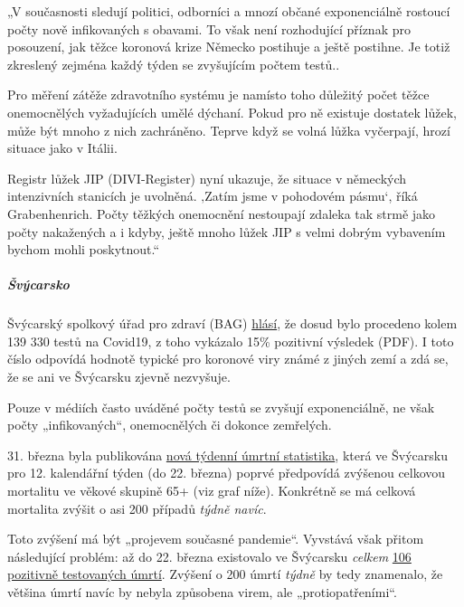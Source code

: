 „V současnosti sledují politici, odborníci a mnozí občané exponenciálně
rostoucí počty nově infikovaných s obavami. To však není rozhodující
příznak pro posouzení, jak těžce koronová krize Německo postihuje a
ještě postihne. Je totiž zkreslený zejména každý týden se zvyšujícím
počtem testů..

Pro měření zátěže zdravotního systému je namísto toho důležitý počet
těžce onemocnělých vyžadujících umělé dýchaní. Pokud pro ně existuje
dostatek lůžek, může být mnoho z nich zachráněno. Teprve když se volná
lůžka vyčerpají, hrozí situace jako v Itálii.

Registr lůžek JIP (DIVI-Register) nyní ukazuje, že situace v německých
intenzivních stanicích je uvolněná. ‚Zatím jsme v pohodovém pásmu`, říká
Grabenhenrich. Počty těžkých onemocnění nestoupají zdaleka tak strmě
jako počty nakažených a i kdyby, ještě mnoho lůžek JIP s velmi dobrým
vybavením bychom mohli poskytnout.``

\hypertarget{ux161vuxfdcarsko}{%
\subparagraph{\texorpdfstring{\textbf{Švýcarsko}}{Švýcarsko}}\label{ux161vuxfdcarsko}}

Švýcarský spolkový úřad pro zdraví (BAG)
\href{https://www.bag.admin.ch/bag/de/home/krankheiten/ausbrueche-epidemien-pandemien/aktuelle-ausbrueche-epidemien/novel-cov/situation-schweiz-und-international.html}{hlásí},
že dosud bylo procedeno kolem 139 330 testů na Covid19, z toho vykázalo
15\% pozitivní výsledek (PDF). I toto číslo odpovídá hodnotě typické pro
koronové viry známé z jiných zemí a zdá se, že se ani ve Švýcarsku
zjevně nezvyšuje.

Pouze v médiích často uváděné počty testů se zvyšují exponenciálně, ne
však počty „infikovaných``, onemocnělých či dokonce zemřelých.

31. března byla publikována
\href{https://www.bfs.admin.ch/bfs/de/home/statistiken/gesundheit/gesundheitszustand/sterblichkeit-todesursachen.html}{nová
týdenní úmrtní statistika}, která ve Švýcarsku pro 12. kalendářní týden
(do 22. března) poprvé předpovídá zvýšenou celkovou mortalitu ve věkové
skupině 65+ (viz graf níže). Konkrétně se má celková mortalita zvýšit o
asi 200 případů \emph{týdně navíc}.

Toto zvýšení má být „projevem současné pandemie``. Vyvstává však přitom
následující problém: až do 22. března existovalo ve Švýcarsku
\emph{celkem}
\href{https://de.wikipedia.org/wiki/COVID-19-Pandemie_in_der_Schweiz\#Todesf\%C3\%A4lle}{106
pozitivně testovaných úmrtí}. Zvýšení o 200 úmrtí \emph{týdně} by tedy
znamenalo, že většina úmrtí navíc by nebyla způsobena virem, ale
„protiopatřeními``.

